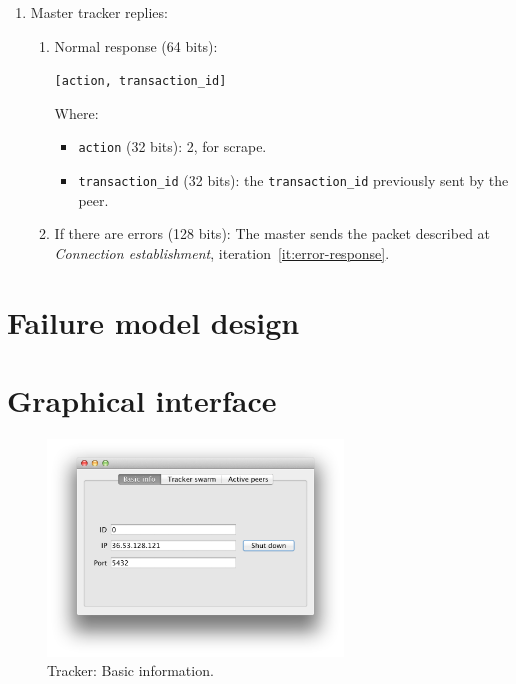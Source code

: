 \documentclass[twoside,a4paper,10pt]{article}
\begin{document}
\begin{itemize}
\begin{itemize}
\begin{enumerate}
    \item Master tracker replies:

      \begin{enumerate}
      \item Normal response (64 bits):

        \texttt{[action, transaction\_id]}

        Where:
        \begin{itemize}
        \item \texttt{action} (32 bits): 2, for scrape.
        \item \texttt{transaction\_id} (32 bits): the \texttt{transaction\_id}
          previously sent by the peer.
        \end{itemize}
        
      \item If there are errors (128 bits): The master sends the packet
        described at \emph{Connection establishment},
        iteration~\ref{it:error-response}.
      \end{enumerate}
    \end{enumerate}
  \end{itemize}
\end{itemize}

\section{Failure model design}

\section{Graphical interface}

\begin{figure}[!htp]
  \centering
  \includegraphics[width=0.7\textwidth]{imgs/tracker/basicInfo.png}
  \caption{\label{fig:basicInfo}Tracker: Basic information.}
\end{figure}
\end{document}
